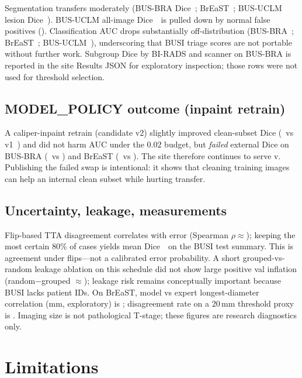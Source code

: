 \documentclass[11pt,a4paper]{article}
\begin{document}
Segmentation transfers moderately (BUS-BRA Dice~\MetricBusbraDice; BrEaST~\MetricBreastDice;
BUS-UCLM lesion Dice~\MetricBusuclmLesionDice). BUS-UCLM all-image Dice~\MetricBusuclmDice\ is
pulled down by normal false positives (\MetricBusuclmNormalFP). Classification AUC drops
substantially off-distribution (BUS-BRA~\MetricBusbraAuc; BrEaST~\MetricBreastAuc;
BUS-UCLM~\MetricBusuclmAuc), underscoring that BUSI triage scores are not portable without further work.
Subgroup Dice by BI-RADS and scanner on BUS-BRA is reported in the site Results JSON for
exploratory inspection; those rows were not used for threshold selection.

\subsection{MODEL\_POLICY outcome (inpaint retrain)}

A caliper-inpaint retrain (candidate v2) slightly improved clean-subset Dice
(\MetricVtwoCleanDice\ vs v1~\MetricVoneCleanDice) and did not harm AUC under the $0.02$ budget, but
\emph{failed} external Dice on BUS-BRA (\MetricVtwoBusbraDice\ vs \MetricVoneBusbraDice) and BrEaST
(\MetricVtwoBreastDice\ vs \MetricVoneBreastDice). The site therefore continues to serve
v\MetricModelVersion. Publishing the failed swap is intentional: it shows that cleaning training
images can help an internal clean subset while hurting transfer.

\subsection{Uncertainty, leakage, measurements}

Flip-based TTA disagreement correlates with error (Spearman $\rho\approx$\MetricTtaSpearman);
keeping the most certain 80\% of cases yields mean Dice~\MetricDiceAtEightyCov\ on the BUSI test
summary. This is agreement under flips---not a calibrated error probability. A short
grouped-vs-random leakage ablation on this schedule did not show large positive val inflation
(random$-$grouped $\approx$\MetricLeakValDelta); leakage risk remains conceptually important because
BUSI lacks patient IDs. On BrEaST, model vs expert longest-diameter correlation (mm,
exploratory) is \MetricMeasDiamCorr; disagreement rate on a $20$\,mm threshold proxy is
\MetricSizeDiscord. Imaging size is not pathological T-stage; these figures are research
diagnostics only.

\section{Limitations}
\end{document}
